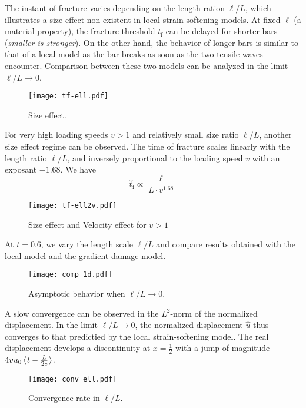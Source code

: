 The instant of fracture varies depending on the length ration $\ell/L$, which illustrates a size effect non-existent in local strain-softening models. At fixed $\ell$ (a material property), the fracture threshold $t_\mathrm{f}$ can be delayed for shorter bars (\emph{smaller is stronger}). On the other hand, the behavior of longer bars is similar to that of a local model as the bar breaks as soon as the two tensile waves encounter. Comparison between these two models can be analyzed in the limit $\ell/L\to 0$.
\begin{figure}[htbp]
\texttt{[image: tf-ell.pdf]}
\caption{Size effect.}
\end{figure}

For very high loading speeds $v>1$ and relatively small size ratio $\ell/L$, another size effect regime can be observed. The time of fracture scales linearly with the length ratio $\ell/L$, and inversely proportional to the loading speed $v$ with an exposant $-1.68$. We have
\[
\widehat{t}_\mathrm{f}\propto\frac{\ell}{L\cdot v^{1.68}}
\]
\begin{figure}[htbp]
\centering
\texttt{[image: tf-ell2v.pdf]}
\caption{Size effect and Velocity effect for $v>1$}
\end{figure}

At $t=0.6$, we vary the length scale $\ell/L$ and compare results obtained with the local model and the gradient damage model.
\begin{figure}[htbp]
\centering
\texttt{[image: comp\_1d.pdf]}
\caption{Asymptotic behavior when $\ell/L\to 0$.}
\end{figure}

A slow convergence can be observed in the $L^2$-norm of the normalized displacement. In the limit $\ell/L\to 0$, the normalized displacement $\widehat{u}$ thus converges to that predictied by the local strain-softening model. The real displacement develops a discontinuity at $x=\frac{1}{2}$ with a jump of magnitude $4vu_0\Braket{t-\frac{L}{2c}}$.
\begin{figure}[htbp]
\texttt{[image: conv\_ell.pdf]}
\caption{Convergence rate in $\ell/L$.}
\end{figure}


